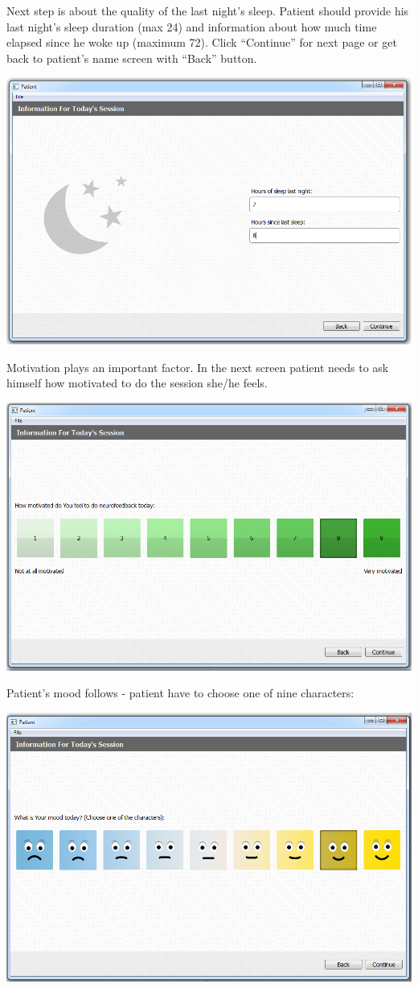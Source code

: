 \documentclass[letterpaper,10pt,english]{sphinxmanual}
\begin{document}
Next step is about the quality of the last night's sleep. Patient should provide his last night's sleep duration (max 24) and information about how much time elapsed since he woke up (maximum 72). Click ``Continue'' for next page or get back to patient's name screen with ``Back'' button.

{\hfill\includegraphics{Hours.PNG}\hfill}

Motivation plays an important factor. In the next screen patient needs to ask himself how motivated to do the session she/he feels.

{\hfill\includegraphics{Motivated.PNG}\hfill}

Patient's mood follows - patient have to choose one of nine characters:

{\hfill\includegraphics{Mood.PNG}\hfill}
\end{document}
